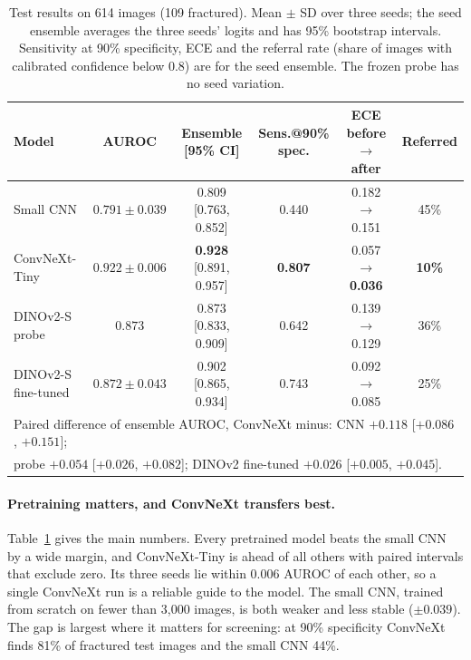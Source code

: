 \documentclass[11pt,a4paper]{article}
\begin{document}
\begin{table}[t]
\centering
\caption{Test results on 614 images (109 fractured). Mean $\pm$ SD over three seeds; the seed ensemble averages the
three seeds' logits and has 95\% bootstrap intervals. Sensitivity at 90\% specificity, ECE and the referral rate (share
of images with calibrated confidence below 0.8) are for the seed ensemble. The frozen probe has no seed variation.}
\label{tab:main}
\footnotesize
\setlength{\tabcolsep}{3pt}
\begin{tabular}{lccccc}
\toprule
Model & AUROC & Ensemble [95\% CI] & Sens.@90\% spec. & ECE before$\rightarrow$after & Referred \\
\midrule
Small CNN               & $0.791 \pm 0.039$ & 0.809 [0.763, 0.852] & 0.440 & 0.182 $\rightarrow$ 0.151 & 45\% \\
ConvNeXt-Tiny           & $0.922 \pm 0.006$ & \textbf{0.928} [0.891, 0.957] & \textbf{0.807} & 0.057 $\rightarrow$ \textbf{0.036} & \textbf{10\%} \\
DINOv2-S probe & $0.873$           & 0.873 [0.833, 0.909] & 0.642 & 0.139 $\rightarrow$ 0.129 & 36\% \\
DINOv2-S fine-tuned & $0.872 \pm 0.043$ & 0.902 [0.865, 0.934] & 0.743 & 0.092 $\rightarrow$ 0.085 & 25\% \\
\midrule
\multicolumn{6}{l}{Paired difference of ensemble AUROC, ConvNeXt minus: CNN $+0.118$ [$+0.086$, $+0.151$];}\\
\multicolumn{6}{l}{probe $+0.054$ [$+0.026$, $+0.082$]; DINOv2 fine-tuned $+0.026$ [$+0.005$, $+0.045$].}\\
\bottomrule
\end{tabular}
\end{table}

\paragraph{Pretraining matters, and ConvNeXt transfers best.} Table~\ref{tab:main} gives the main numbers. Every
pretrained model beats the small CNN by a wide margin, and ConvNeXt-Tiny is ahead of all others with paired intervals
that exclude zero. Its three seeds lie within 0.006 AUROC of each other, so a single ConvNeXt run is a reliable guide
to the model. The small CNN, trained from scratch on fewer than 3,000 images, is both weaker and less stable
($\pm 0.039$). The gap is largest where it matters for screening: at 90\% specificity ConvNeXt finds 81\% of fractured
test images and the small CNN 44\%.
\end{document}
